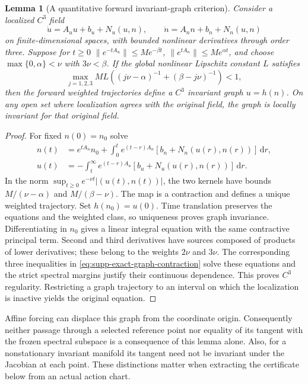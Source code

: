 \documentclass[11pt]{article}
\numberwithin{equation}{section}
\newtheorem{lemma}[lemma]{Lemma}
\theoremstyle{definition}
\theoremstyle{remark}
\newcommand{\dd}{\mathrm d}
\begin{document}
\begin{lemma}[A quantitative forward invariant-graph criterion]
\label{lem:supp-exact-graph-criterion}
Consider a localized $C^3$ field
\begin{equation}
 \dot u=A_u u+b_u+N_u(u,n),\qquad
 \dot n=A_n n+b_n+N_n(u,n)
 \label{eq:supp-exact-graph-field}
\end{equation}
on finite-dimensional spaces, with bounded nonlinear derivatives through
order three. Suppose for $t\ge0$
$\|e^{-tA_u}\|\le Me^{-\beta t}$,
$\|e^{tA_n}\|\le Me^{\alpha t}$, and choose
$\max\{0,\alpha\}<\nu$ with $3\nu<\beta$. If the global nonlinear Lipschitz constant
$L$ satisfies
\begin{equation}
 \max_{j=1,2,3}ML\left((j\nu-\alpha)^{-1}
                             +(\beta-j\nu)^{-1}\right)<1,
 \label{eq:supp-exact-graph-contraction}
\end{equation}
then the forward weighted trajectories define a $C^3$ invariant graph
$u=h(n)$. On any open set where localization agrees with the original
field, the graph is locally invariant for that original field.
\end{lemma}
\begin{proof}
For fixed $n(0)=n_0$ solve
\begin{align*}
 n(t)&=e^{tA_n}n_0+\int_0^t e^{(t-r)A_n}
                          [b_n+N_n(u(r),n(r))]\,\dd r,\\
 u(t)&=-\int_t^\infty e^{(t-r)A_u}
                          [b_u+N_u(u(r),n(r))]\,\dd r.
\end{align*}
In the norm $\sup_{t\ge0}e^{-\nu t}|(u(t),n(t))|$, the two kernels have
bounds $M/(\nu-\alpha)$ and $M/(\beta-\nu)$. The map is a contraction
and defines a unique weighted trajectory. Set $h(n_0)=u(0)$.
Time translation preserves the equations and the weighted class, so
uniqueness proves graph invariance. Differentiating in $n_0$ gives a linear
integral equation with the same contractive principal term. Second and
third derivatives have sources composed of products of lower derivatives;
these belong to the weights $2\nu$ and $3\nu$. The corresponding three
inequalities in \eqref{eq:supp-exact-graph-contraction} solve these equations
and the strict spectral margins justify their continuous dependence.
This proves $C^3$ regularity. Restricting a graph trajectory to an interval
on which the localization is inactive yields the original equation.
\end{proof}

Affine forcing can displace this graph from the coordinate origin.
Consequently neither passage through a selected reference point nor equality
of its tangent with the frozen spectral subspace is a consequence of this
lemma alone. Also, for a nonstationary invariant manifold its tangent need
not be invariant under the Jacobian at each point. These distinctions matter
when extracting the certificate below from an actual action chart.
\end{document}
